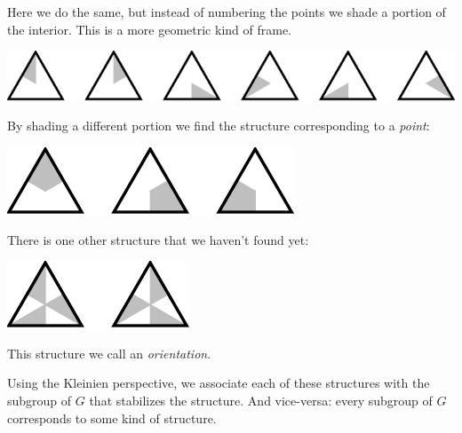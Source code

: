 \documentclass[11pt,oneside]{article}
\begin{document}
Here we do the same, but instead of numbering the points
we shade a portion of the interior.
This is a more geometric kind of frame.
\begin{center}
\includegraphics[]{pic-triangle-frames.pdf} 
\end{center}
By shading a different portion we find the structure
corresponding to a \emph{point}:
\begin{center}
\includegraphics[]{pic-triangle-points.pdf} 
\end{center}
There is one other structure that we haven't found yet:
\begin{center}
\includegraphics[]{pic-triangle-orientations.pdf} 
\end{center}
This structure we call an \emph{orientation}.

Using the Kleinien perspective, we associate
each of these structures with the subgroup of $G$
that stabilizes the structure.
And vice-versa: every subgroup of $G$ corresponds
to some kind of structure.

\end{document}
